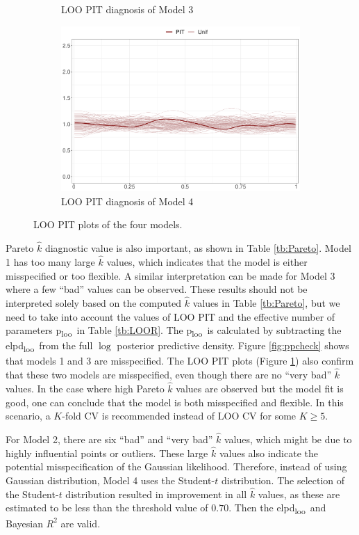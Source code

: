 \documentclass[a4paper]{article}   	%
\newcommand{\elpd}{elpd\textsubscript{loo}}
\newcommand{\ploo}{p\textsubscript{loo}}
\begin{document}
\begin{figure}[!htp]
\begin{subfigure}[t]{0.45\textwidth}
			\caption{LOO PIT diagnosis of Model 3}
		\end{subfigure}
		\begin{subfigure}[t]{0.45\textwidth}
			\includegraphics[width=\linewidth]{Images/pit_STRand_scale.pdf}
			\caption{LOO PIT diagnosis of Model 4}
		\end{subfigure}
		\caption{LOO PIT plots of the four models. }\label{fig:pitloo}
	\end{figure}
	
	
	Pareto $\hat{k}$ diagnostic value is also important, as shown in Table \ref{tb:Pareto}. Model 1 has too many large $\hat{k}$ values, which indicates that the model is either misspecified or too flexible. A similar interpretation can be made for Model 3 where a few ``bad'' values can be observed. These results should not be interpreted solely based on the computed $\hat{k}$ values in Table \ref{tb:Pareto}, but we need to take into account the values of LOO PIT and the effective number of parameters \ploo\ in Table \ref{tb:LOOR}. The \ploo\ is calculated by subtracting the \elpd\ from the full $\log$ posterior predictive density. Figure \ref{fig:ppcheck} shows that models 1 and 3 are misspecified. The LOO PIT plots (Figure \ref{fig:pitloo}) also confirm that these two models are misspecified, even though there are no ``very bad'' $\hat{k}$ values. In the case where high Pareto $\hat{k}$ values are observed but the model fit is good, one can conclude that the model is both misspecified and flexible. In this scenario, a $K$-fold CV is recommended instead of LOO CV for some $K \geq 5$. 
	
	For Model 2, there are six ``bad'' and ``very bad'' $\hat{k}$ values, which might be due to highly influential points or outliers. These large $\hat{k}$ values also indicate the potential misspecification of the Gaussian likelihood. Therefore, instead of using Gaussian distribution, Model 4 uses the Student-$t$ distribution. The selection of the Student-$t$ distribution resulted in improvement in all $\hat{k}$ values, as these are estimated to be less than the threshold value of $0.70$. Then the \elpd\ and Bayesian $R^2$ are valid. 
	
\end{document}
